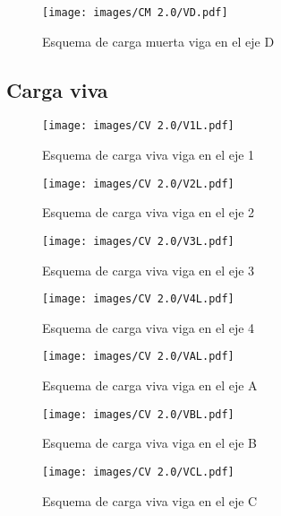 \documentclass[12pt]{article}
\begin{document}
\begin{figure}[H]
    \centering
    \texttt{[image: images/CM 2.0/VD.pdf]}
    \caption{Esquema de carga muerta viga en el eje D}
    \label{fig:EsqVigaEjeD}
\end{figure}

\subsection{Carga viva}

\begin{figure}[H]
    \centering
    \texttt{[image: images/CV 2.0/V1L.pdf]}
    \caption{Esquema de carga viva viga en el eje 1}
    \label{fig:EsqVigaEje1V}
\end{figure}

\begin{figure}[H]
    \centering
    \texttt{[image: images/CV 2.0/V2L.pdf]}
    \caption{Esquema de carga viva viga en el eje 2}
    \label{fig:EsqVigaEje2V}
\end{figure}

\begin{figure}[H]
    \centering
    \texttt{[image: images/CV 2.0/V3L.pdf]}
    \caption{Esquema de carga viva viga en el eje 3}
    \label{fig:EsqVigaEje3V}
\end{figure}

\begin{figure}[H]
    \centering
    \texttt{[image: images/CV 2.0/V4L.pdf]}
    \caption{Esquema de carga viva viga en el eje 4}
    \label{fig:EsqVigaEje4V}
\end{figure}

\begin{figure}[H]
    \centering
    \texttt{[image: images/CV 2.0/VAL.pdf]}
    \caption{Esquema de carga viva viga en el eje A}
    \label{fig:EsqVigaEjeAV}
\end{figure}

\begin{figure}[H]
    \centering
    \texttt{[image: images/CV 2.0/VBL.pdf]}
    \caption{Esquema de carga viva viga en el eje B}
    \label{fig:EsqVigaEjeBV}
\end{figure}

\begin{figure}[H]
    \centering
    \texttt{[image: images/CV 2.0/VCL.pdf]}
    \caption{Esquema de carga viva viga en el eje C}
    \label{fig:EsqVigaEjeCV}
\end{figure}
\end{document}
